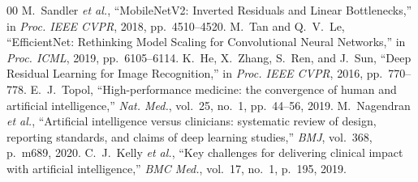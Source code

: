 \documentclass[journal]{IEEEtran}
\begin{document}
\begin{thebibliography}{00}
 M.~Sandler \textit{et al.}, ``MobileNetV2: Inverted Residuals and Linear Bottlenecks,'' in \textit{Proc. IEEE CVPR}, 2018, pp.~4510--4520.
 M.~Tan and Q.~V.~Le, ``EfficientNet: Rethinking Model Scaling for Convolutional Neural Networks,'' in \textit{Proc. ICML}, 2019, pp.~6105--6114.
 K.~He, X.~Zhang, S.~Ren, and J.~Sun, ``Deep Residual Learning for Image Recognition,'' in \textit{Proc. IEEE CVPR}, 2016, pp.~770--778.
 E.~J.~Topol, ``High-performance medicine: the convergence of human and artificial intelligence,'' \textit{Nat. Med.}, vol.~25, no.~1, pp.~44--56, 2019.
 M.~Nagendran \textit{et al.}, ``Artificial intelligence versus clinicians: systematic review of design, reporting standards, and claims of deep learning studies,'' \textit{BMJ}, vol.~368, p.~m689, 2020.
 C.~J.~Kelly \textit{et al.}, ``Key challenges for delivering clinical impact with artificial intelligence,'' \textit{BMC Med.}, vol.~17, no.~1, p.~195, 2019.
\end{thebibliography}
\end{document}
